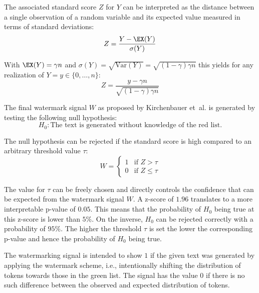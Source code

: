 	The associated standard score $Z$ for $Y$ can be interpreted as the distance between a single observation of a random variable and its expected value measured in terms of standard deviations:
    \begin{equation}
        Z = \frac{Y - \EX(Y)}{\sigma(Y)}
    \end{equation}
	
	With $\EX(Y) = \gamma n$ and $\sigma(Y) = \sqrt{\mathrm{Var}(Y)} = \sqrt{(1-\gamma) \gamma n}$ this yields for any realization of $Y = y \in \{0, \dots, n\}$:
	\begin{equation}
        Z = \frac{y - \gamma n}{\sqrt{(1-\gamma) \gamma n}}
    \end{equation}

    The final watermark signal $W$ as proposed by Kirchenbauer et~al.\cite{kirchenbauer2023watermark} is generated by testing the following null hypothesis:
    \begin{equation*}
        H_0: \text{The text is generated without knowledge of the red list}.
    \end{equation*}

    The null hypothesis can be rejected if the standard score is high compared to an arbitrary threshold value $\tau$:
    \begin{equation}
        W  = 
			\begin{cases}
            	1 & \text{if $Z > \tau$} \\
				0 & \text{if $Z \leq \tau$}
			\end{cases}
    \end{equation}

	The value for $\tau$ can be freely chosen and directly controls the confidence that can be expected from the watermark signal $W$.
    A z-score of $1.96$ translates to a more interpretable p-value of $0.05$.
    This means that the probability of $H_0$ being true at this z-score is lower than $5\%$.
    On the inverse, $H_0$ can be rejected correctly with a probability of $95\%$.
    The higher the threshold $\tau$ is set the lower the corresponding p-value and hence the probability of $H_0$ being true.

	The watermarking signal is intended to show $1$ if the given text was generated by applying the watermark scheme, i.e., intentionally shifting the distribution of tokens towards those in the green list.
	The signal has the value $0$ if there is no such difference between the observed and expected distribution of tokens. 

